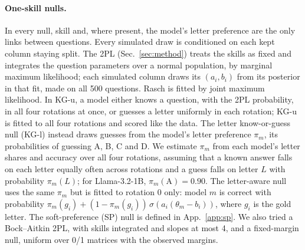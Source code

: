 \documentclass{article}
\theoremstyle{plain}
\theoremstyle{remark}
\begin{document}
\paragraph{One-skill nulls.} In every null, skill and, where present,
the model's letter preference are the only links between questions. Every simulated draw is conditioned on each kept
column staying split. The 2PL (Sec.~\ref{sec:method}) treats the skills
as fixed and integrates the question parameters over a normal
population, by marginal maximum likelihood; each simulated column draws
its $(a_i,b_i)$ from its posterior in that fit, made on all 500
questions. Rasch is fitted by joint maximum likelihood. In KG-u, a model
either knows a question, with the 2PL probability, in all four rotations
at once, or guesses a letter uniformly in each rotation; KG-u is fitted
to all four rotations and scored like the data. The letter know-or-guess
null (KG-l) instead draws guesses from the model's letter preference
$\pi_m$, its probabilities of guessing A, B, C and D. We estimate
$\pi_m$ from each model's letter shares and accuracy over all four
rotations, assuming that a known answer falls on each letter equally
often across rotations and a guess falls on letter $L$ with probability
$\pi_m(L)$; for Llama-3.2-1B, $\pi_m(\mathrm{A})=0.90$. The letter-aware
null uses the same $\pi_m$ but is fitted to rotation 0 only: model $m$
is correct with probability
$\pi_m(g_i)+(1-\pi_m(g_i))\,\sigma(a_i(\theta_m-b_i))$, where $g_i$ is
the gold letter. The soft-preference (SP) null is defined in
App.~\ref{app:sp}. We also tried a Bock--Aitkin 2PL, with skills
integrated and slopes at most 4, and a fixed-margin null, uniform over
0/1 matrices with the observed margins.
\end{document}
